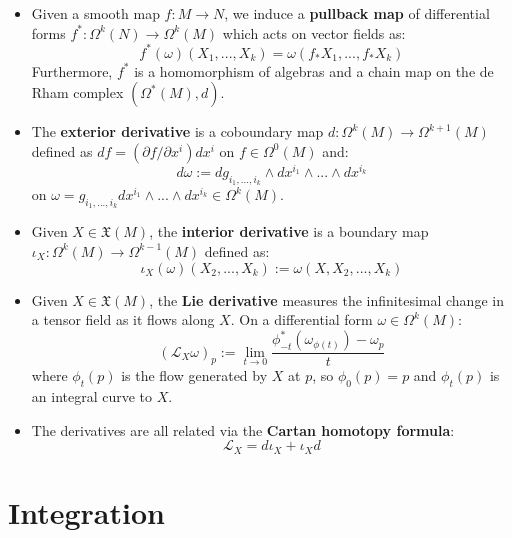 \begin{itemize}
	\item Given a smooth map $f : M\rightarrow N$, we induce a \textbf{pullback map} of differential forms $f^* : \Omega^k(N)
	\rightarrow\Omega^k(M)$ which acts on vector fields as:
	\begin{equation}
		f^*(\omega)(X_1, ..., X_k) = \omega(f_* X_1, ..., f_* X_k)
	\end{equation}
	Furthermore, $f^*$ is a homomorphism of algebras and a chain map on the de Rham complex $(\Omega^*(M), d)$. 
	
	\item The \textbf{exterior derivative} is a coboundary map $d : \Omega^k(M)\rightarrow\Omega^{k + 1}(M)$ defined as 
	$df = (\partial f / \partial x^i)dx^i$ on $f\in\Omega^0(M)$ and:
	\begin{equation}
		d\omega := dg_{i_1, ..., i_k}\wedge dx^{i_1}\wedge ...\wedge 
		dx^{i_k}
	\end{equation}
	on $\omega = g_{i_1, ..., i_k} dx^{i_1}\wedge...\wedge dx^{i_k}\in\Omega^k(M)$. 
	
	\item Given $X\in\mathfrak X(M)$, the \textbf{interior derivative} is a boundary map $\iota_X : \Omega^k(M)
	\rightarrow\Omega^{k - 1}(M)$ defined as:
	\begin{equation}
		\iota_X(\omega)(X_2, ..., X_k) := \omega(X, X_2, ..., X_k)
	\end{equation}
	
	\item Given $X\in\mathfrak X(M)$, the \textbf{Lie derivative} measures the infinitesimal change in a tensor field as it 
	flows along $X$. On a differential form $\omega\in\Omega^k(M)$:
	\begin{equation}
		(\mathcal L_X\omega)_p := \lim_{t\rightarrow 0}\frac{\phi_{-t}^* (\omega_{\phi(t)}) - \omega_p}{t}
	\end{equation}
	where $\phi_t(p)$ is the flow generated by $X$ at $p$, so $\phi_0(p) = p$ and $\phi_t(p)$ is an integral curve to $X$. 
	
	\item The derivatives are all related via the \textbf{Cartan homotopy formula}:
	\begin{equation}
		\mathcal L_X = d\iota_X + \iota_X d
	\end{equation}
\end{itemize}

\newpage
\section{Integration}

